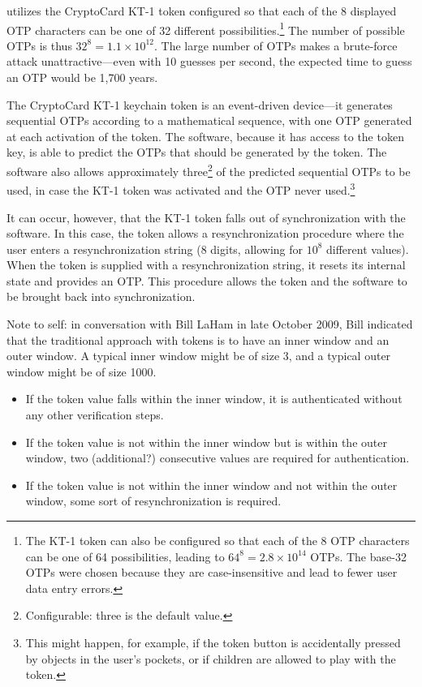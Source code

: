 \emph{\productbasename{}} utilizes the CryptoCard KT-1 token configured
so that each of the 8 displayed OTP characters can be one of 32 different
possibilities.\footnote{The KT-1 token can also be configured so that 
each of the 8 OTP characters can be one of 64 possibilities, leading to
$64^8 = 2.8 \times 10^{14}$ OTPs.  The base-32
OTPs were chosen because they are case-insensitive and lead to fewer user 
data entry errors.}  
The number of possible OTPs is thus $32^8 = 1.1 \times 10^{12}$.
The large number of OTPs makes a brute-force attack unattractive---even with 10 guesses
per second, the expected time to guess an OTP would be 1,700 years.

The CryptoCard KT-1 keychain token is an event-driven device---it generates
sequential OTPs according to a mathematical sequence, with one OTP generated
at each activation of the token.  The \productbasename{} software, because
it has access to the token key, is able to predict the OTPs that should be
generated by the token.  The \productbasename{} software also allows approximately
three\footnote{Configurable:  three is the default value.}
of the predicted sequential OTPs to be used, in case the KT-1 token was activated
and the OTP never used.\footnote{This might happen, for example, if the token button
is accidentally pressed by objects in the user's pockets, or if children are
allowed to play with the token.}

It can occur, however, that the KT-1 token falls out of synchronization with
the \productbasename{} software.  In this case, the token allows a resynchronization
procedure where the user enters a resynchronization string (8 digits,
allowing for $10^8$ different values).  When the token is supplied
with a resynchronization string, it resets its internal state and provides
an OTP.  This procedure allows the token and the \productbasename{} software
to be brought back into synchronization.

Note to self:  in conversation with Bill LaHam in late October 2009, Bill indicated
that the traditional approach with tokens is to have an inner window and an outer
window.  A typical inner window might be of size 3, and a typical outer window might
be of size 1000.

\begin{itemize}
\item If the token value falls within the inner window, it is authenticated without
      any other verification steps.
\item If the token value is not within the inner window but is within the outer
      window, two (additional?) consecutive values are required for authentication.
\item If the token value is not within the inner window and not within the
      outer window, some sort of resynchronization is required.
\end{itemize}

